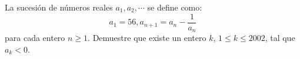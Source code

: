 La sucesión de números reales $a_1, a_2, \cdots$ se define como:
\[ a_1 = 56, a_{n+1} = a_n - \frac{1}{a_n} \]
para cada entero $n \geq 1$. \newline 
Demuestre que existe un entero $k$, $1 \leq k \leq 2002$, tal que $a_k < 0$.
